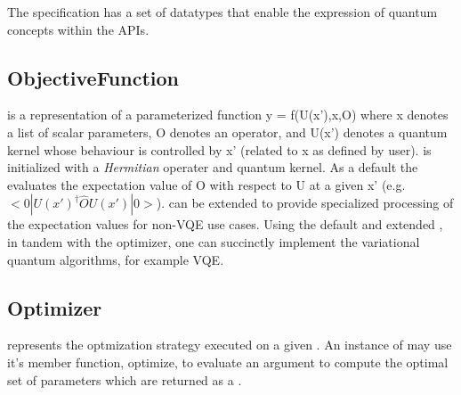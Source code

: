 The \qcor specification has a set of datatypes that enable the expression of quantum concepts within the \qcor \ac{API}s.\\

\subsection{\textbf{ObjectiveFunction}}\label{subsec:ObjectiveFunction}
 is a representation of a parameterized function y = f(U(x'),x,O)
where x denotes a list of scalar parameters, O denotes an operator, and U(x') denotes a quantum kernel whose behaviour is controlled by x' (related to x as defined by user).  is initialized with a {\em Hermitian} operater and quantum kernel. As a default the  evaluates the expectation value of O with respect to U at a given x' (e.g. $<0|U(x')^\dagger \hat{O} U(x')|0>$).  can be extended to provide specialized processing of the expectation values for non-VQE use cases. Using the default and extended , in tandem with the optimizer, one can succinctly implement the variational quantum algorithms, for example VQE.  

\subsection{\textbf{Optimizer}}\label{subsec:Optimizer}
 represents the optmization strategy executed on a given . An instance of  may use it's member function, optimize, to evaluate an  argument to compute the optimal set of parameters which are returned as a .\\


